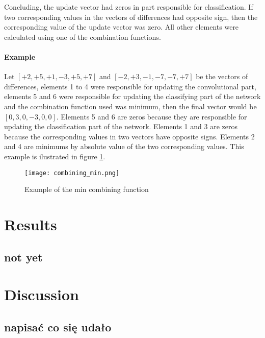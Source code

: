 \documentclass[a4paper,10pt]{report}
\begin{document}
      
      	
      Concluding, the update vector had zeros in part responsible for classification. If two corresponding values in the vectors of differences had opposite sign, then the corresponding value of the update vector was zero. All other elements were calculated using one of the combination functions.\\
      
      \subsubsection{Example}
      Let $[+2, +5, +1, -3, +5, +7]$ and $[-2, +3, -1, -7, -7, +7]$ be the vectors of differences, elements 1 to 4 were responsible for updating the convolutional part, elements 5 and 6 were responsible for updating the classifying part of the network and the combination function used was minimum, then the final vector would be $[0, 3, 0, -3, 0, 0]$. Elements 5 and 6 are zeros because they are responsible for updating the classification part of the network. Elements 1 and 3 are zeros because the corresponding values in two vectors have opposite signs. Elements 2 and 4 are minimums by absolute value of the two corresponding values. This example is ilustrated in figure \ref{fig:combining}.\\
      
      \begin{figure}[h!]
	  \centering
	  \texttt{[image: combining\_min.png]}
	  \caption{Example of the min combining function}
	  \label{fig:combining}
	\end{figure} 
	
   \chapter{Results} %
    \section{not yet}
     
	
  \chapter{Discussion}
    \section{napisać co się udało}
\end{document}
